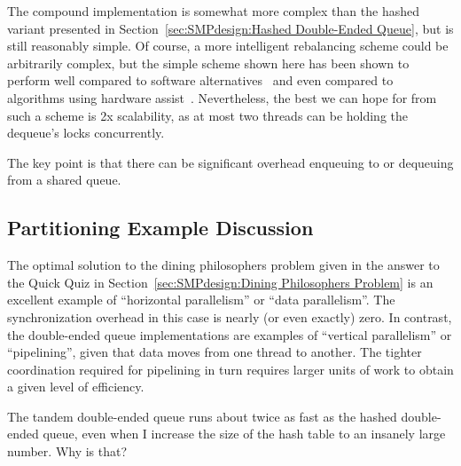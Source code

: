The compound implementation is somewhat more complex than the
hashed variant presented in
Section~\ref{sec:SMPdesign:Hashed Double-Ended Queue},
but is still reasonably simple.
Of course, a more intelligent rebalancing scheme could be arbitrarily
complex, but the simple scheme shown here has been shown to
perform well compared to software
alternatives~\cite{LukeDalessandro:2011:ASPLOS:HybridNOrecSTM:deque}
and even compared to algorithms using hardware
assist~\cite{DavidDice:2010:SCA:HTM:deque}.
Nevertheless, the best we can hope for from such a scheme
is 2x scalability, as at most two threads can be holding the
dequeue's locks concurrently.

The key point is that there can be significant overhead enqueuing to
or dequeuing from a shared queue.

\subsection{Partitioning Example Discussion}
\label{sec:SMPdesign:Partitioning Example Discussion}

The optimal solution to the dining philosophers problem given in
the answer to the Quick Quiz in
Section~\ref{sec:SMPdesign:Dining Philosophers Problem}
is an excellent example of ``horizontal parallelism'' or
``data parallelism''.
The synchronization overhead in this case is nearly (or even exactly)
zero.
In contrast, the double-ended
queue implementations are examples of ``vertical parallelism'' or
``pipelining'', given that data moves from one thread to another.
The tighter coordination required for pipelining in turn requires
larger units of work to obtain a given level of efficiency.

\QuickQuiz{}
	The tandem double-ended queue runs about twice as fast as
	the hashed double-ended queue, even when I increase the
	size of the hash table to an insanely large number.
	Why is that?
 \QuickQuizEnd

